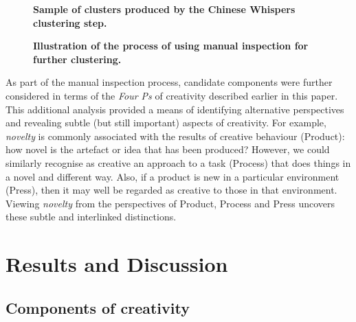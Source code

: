 \documentclass[10pt,letterpaper]{article}
\begin{document}
\begin{figure}
\caption{{\bf Sample of clusters produced by the Chinese Whispers clustering step.}}
\label{clustersZoom}
\end{figure}  

\begin{figure}
\caption{{\bf Illustration of the process of using manual inspection for further clustering.}}
\label{clusterToComponents}
\end{figure}  


As part of the manual inspection process, candidate components were further considered in terms of the {\em Four Ps} of creativity \cite{rhodes61,mooney63,mackinnon70,kaufman09} described earlier in this paper. This additional analysis provided a means of identifying alternative perspectives and revealing subtle (but still important) aspects of creativity.  For example, {\em novelty} is commonly associated with the results of creative behaviour (Product): how novel is the artefact or idea that has been produced? However, we could similarly recognise as creative an approach to a task  (Process) that does things in a novel and different way.  Also, if a product is new in a particular environment (Press), then it may well be regarded as creative to those in that environment. Viewing {\em novelty} from the perspectives of Product, Process and Press uncovers these subtle and interlinked distinctions.


\section*{Results and Discussion}
\label{results}

\subsection*{Components of creativity}\label{componentsResults}
\end{document}
